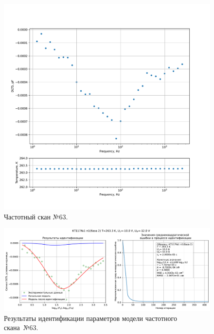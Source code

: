 \begin{figure}[!ht]
    \centering
    \includegraphics[width=1\textwidth]{../plots/КТ117№1_п1(база 2)_2500Гц-1Гц_1пФ_-10С_-10В-12В_20мВ_20мкс_шаг_0,1.pdf}
    \caption{Частотный скан №63.}
    \label{pic:frequency_scan_63}
\end{figure}

\begin{figure}[!ht]
    \centering
    \includegraphics[width=1\textwidth]{../plots/КТ117№1_п1(база 2)_2500Гц-1Гц_1пФ_-10С_-10В-12В_20мВ_20мкс_шаг_0,1_model.pdf}
    \caption{Результаты идентификации параметров модели частотного скана~№63.}
    \label{pic:frequency_scan_model63}
\end{figure}

\pagebreak


